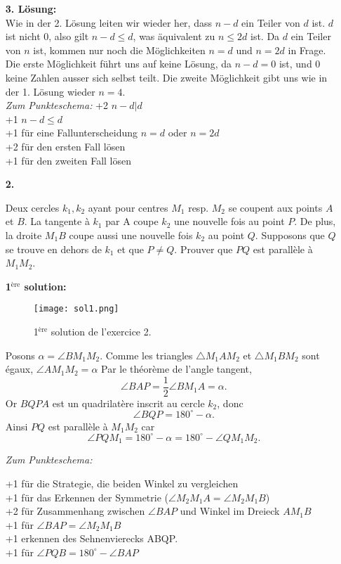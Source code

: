 \documentclass[12pt,a4paper]{article}
\theoremstyle{plain}
\theoremstyle{definition}
\theoremstyle{remark}
\begin{document}
\begin{enumerate}
\textbf{3. Lösung:}\\
Wie in der 2. Lösung leiten wir wieder her, dass $n-d$ ein Teiler von $d$ ist. $d$ ist nicht 0, also gilt $n-d\leq d$, was äquivalent zu $n\leq 2d$ ist. Da $d$ ein Teiler von $n$ ist, kommen nur noch die Möglichkeiten $n=d$ und $n=2d$ in Frage. Die erste Möglichkeit führt uns auf keine Lösung, da $n-d=0$ ist, und 0 keine Zahlen ausser sich selbst teilt. Die zweite Möglichkeit gibt uns wie in der 1. Lösung wieder $n=4$.\\

\emph{Zum Punkteschema:}
+2 $n-d|d$\\
+1 $n-d \leq d$\\
+1 für eine Fallunterscheidung $n=d$ oder $n=2d$\\
+2 für den ersten Fall lösen\\
+1 für den zweiten Fall lösen\\
\newpage


\item[\textbf{2.}]

Deux cercles $k_1,k_2$ ayant pour centres $M_1$ resp. $M_2$ se coupent aux points $A$ et $B$. La tangente à $k_1$ par A coupe $k_2$ une nouvelle fois au point $P$. De plus, la droite $M_1B$ coupe aussi une nouvelle fois $k_2$ au point $Q$. Supposons que $Q$ se trouve en dehors de $k_1$ et que $P\neq Q$. Prouver que $PQ$ est parallèle à $M_1M_2$.

\bigskip\noindent
\textbf{1$^\text{ère}$ solution:}
\begin{figure}[h]
\texttt{[image: sol1.png]}
\caption{1$^\text{ère}$ solution de l'exercice 2.}
\end{figure}
Posons $\alpha= \angle BM_1M_2$. Comme les triangles $\triangle M_1 A M_2$ et $\triangle M_1 BM_2$ sont égaux, $\angle A M_1 M_2 = \alpha$ Par le théorème de l'angle tangent,  
$$\angle BAP= \frac{1}{2} \angle BM_1 A = \alpha .$$
Or $BQPA$ est un quadrilatère inscrit au cercle $k_2$, donc $$\angle BQP = 180^\circ - \alpha.$$ Ainsi $PQ$ est parallèle à $M_1M_2$ car  $$\angle PQM_1 = 180^\circ - \alpha = 180^\circ - \angle QM_1M_2.$$

\emph{Zum Punkteschema:}

+1 für die Strategie, die beiden Winkel zu vergleichen\\
+1 für das Erkennen der Symmetrie ($\angle M_2M_1A=\angle M_2M_1B$) \\
+2 für Zusammenhang zwischen $\angle BAP$ und Winkel im Dreieck $AM_1B$\\
+1 für $\angle BAP=\angle M_2M_1B$\\
+1 erkennen des Sehnenvierecks ABQP.\\
+1 für $\angle PQB = 180^\circ-\angle BAP$\\


\end{enumerate}
\end{document}
